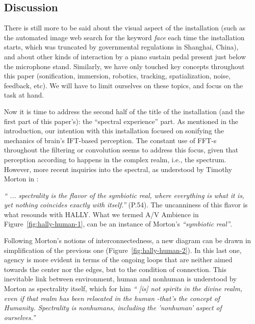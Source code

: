 \documentclass{nime-alternate}
\begin{document}
\subsection{Discussion}
There is still more to be said about the visual aspect of the installation (such as the automated image web search for the keyword \textit{face} each time the installation starts, which was truncated by governmental regulations in Shanghai, China), and about other kinds of interaction by a piano sustain pedal present just below the microphone stand. Similarly, we have only touched key concepts throughout this paper (sonification, immersion, robotics, tracking, spatialization, noise, feedback, etc). We will have to limit ourselves on these topics, and focus on the task at hand.

Now it is time to address the second half of the title of the installation (and the first part of this paper's): the ``spectral experience'' part. As mentioned in the introduction, our intention with this installation focused on sonifying the mechanics of brain's IFT-based perception. The constant use of FFT-s throughout the filtering or convolution seems to address this focus, given that perception according to \cite{connes:shapes} happens in the complex realm, i.e., the spectrum. However, more recent inquiries into the spectral, as understood by Timothy Morton in \cite{morton:humankind}:


\textit{`` ... spectrality is the flavor of the symbiotic real, where everything is what it is, yet nothing coincides exactly with itself.''} (P.54). The uncanniness of this flavor is what resounds with HALLY. What we termed A/V Ambience in Figure~\ref{fig:hally-human-1}, can be an instance of Morton's \textit{``symbiotic real''}. 

Following Morton's notions of interconnectedness, a new diagram can be drawn in simplification of the previous one (Figure~\ref{fig:hally-human-2}). In this last one, agency is more evident in terms of the ongoing loops that are neither aimed towards the center nor the edges, but to the condition of connection. This inevitable link between environment, human and nonhuman is understood by Morton as spectrality itself, which for him \textit{`` [is] not spirits in the divine realm, even if that realm has been relocated in the human -that's the concept of Humanity. Spectrality is nonhumans, including the 'nonhuman' aspect of ourselves.''}
\end{document}
